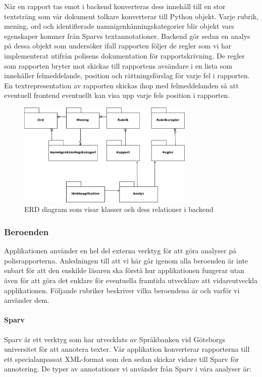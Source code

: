 \documentclass[swedish]{maucsthesis}
\begin{document}
När en rapport tas emot i backend konverteras dess innehåll till en stor
textsträng som vår dokument tolkare konverterar till Python objekt. Varje
rubrik, mening, ord och identifierade namnigenkänningskategorier blir objekt
vars egenskaper kommer från Sparvs textannotationer. Backend gör sedan en analys
på dessa objekt som undersöker ifall rapporten följer de regler som vi har
implementerat utifrån polisens dokumentation för rapportskrivning. De regler som
rapporten bryter mot skickas till rapportens avsändare i en lista som innehåller
felmeddelande, position och rättningsförslag för varje fel i rapporten. En
textrepresentation av rapporten skickas ihop med felmeddelanden så att eventuell
frontend eventuellt kan visa upp varje fels position i rapporten.

\begin{figure}[H]
    \centering
    \includegraphics[width=0.75\textwidth]{backenderd}
    \caption{ERD diagram som visar klasser och dess relationer i backend}
    \label{fig:erdbackend}
\end{figure}

\subsubsection{Beroenden}

Applikationen använder en hel del externa verktyg för att göra analyser på
polisrapporterna. Anledningen till att vi här går igenom alla beroenden är inte
enbart för att den enskilde läsaren ska förstå hur applikationen fungerar utan
även för att göra det enklare för eventuella framtida utvecklare att
vidareutveckla applikationen. Följande rubriker beskriver vilka beroendena är
och varför vi använder dem. 

\paragraph{Sparv}
Sparv är ett verktyg som har utvecklats av Språkbanken vid Göteborgs universitet
för att annotera texter. Vår applikation konverterar rapporterna till ett
specialanpassat XML-format som den sedan skickar vidare till Sparv för
annotering. De typer av annotationer vi använder från Sparv i våra analyser är:
\end{document}

